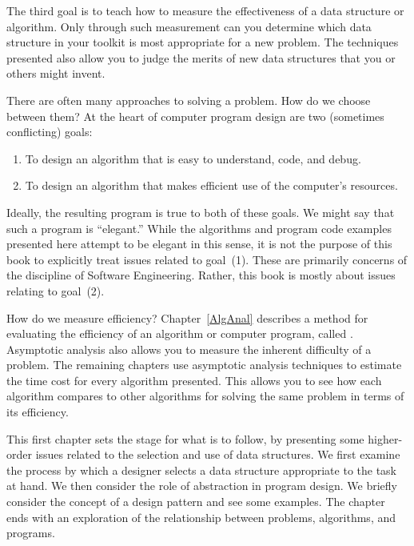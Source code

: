 The third goal is to teach how to measure the
effectiveness of a data structure or algorithm.
Only through such measurement can you determine which data
structure in your toolkit is most appropriate for a new problem.
The techniques presented also allow you to judge the merits of
new data structures that you or others might invent.

There are often many approaches to solving a problem.
How do we choose between them?
At the heart of computer program design are two (sometimes conflicting)
goals:

\begin{enumerate}

\item
To design an algorithm that is easy to understand, code, and debug.

\item
To design an algorithm that makes efficient use of the computer's
resources.

\end{enumerate}

Ideally, the resulting program is true to both of these goals.
We might say that such a program is ``elegant.''
While the algorithms and program code examples presented here
attempt to be elegant in this sense,
it is not the purpose of this book to explicitly treat issues related
to goal~(1).
These are primarily concerns of the discipline of
Software Engineering.
Rather, this book is mostly about issues relating to goal~(2).

How do we measure efficiency?
Chapter~\ref{AlgAnal} describes a method for evaluating the
efficiency of an algorithm or computer program, called
.
Asymptotic analysis also allows you to measure the inherent difficulty
of a problem.
The remaining chapters use asymptotic analysis techniques to estimate
the time cost for every algorithm presented.
This allows you to see how each algorithm compares to other
algorithms for solving the same problem in terms of its
efficiency.

This first chapter sets the stage for what is to follow, by presenting
some higher-order issues related to the selection and use of data
structures.
We first examine the process by which a designer selects a data
structure appropriate to the task at hand.
We then consider the role of abstraction in program design.
We briefly consider the concept of a design pattern and see some
examples.
The chapter ends with an exploration of the relationship between
problems, algorithms, and programs.


